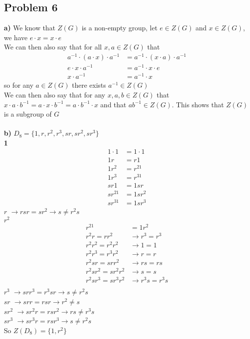 \documentclass[12pt]{article}
\begin{document}
\subsection*{Problem 6}
\textbf{a) } We know that $Z(G)$ is a non-empty group, let $e \in Z(G)$ and $x \in Z(G)$, we have $e \cdot x = x \cdot e$\\
We can then also say that for all $x,a \in Z(G)$ that
\begin{align*}
a^{-1} \cdot (a \cdot x) \cdot a^{-1} &= a^{-1} \cdot (x \cdot a) \cdot a^{-1} \\
e \cdot x \cdot a^{-1} &= a^{-1} \cdot x \cdot e\\
x \cdot a^{-1} &= a^{-1} \cdot x
\end{align*}
so for any $a \in Z(G)$ there exists $a^{-1} \in Z(G)$\\
We can then also say that for any $x,a,b \in Z(G)$ that $x \cdot a \cdot b^{-1} = a \cdot x \cdot b^{-1} = a \cdot b^{-1} \cdot x$ and that $ab^{-1} \in Z(G)$. This shows that $Z(G)$ is a subgroup of $G$ \\\\
\textbf{b) } $D_8 = \{ 1, r, r^2, r^3, sr, sr^2, sr^3 \}$ \\
\textbf{1 }
\begin{align*}
1 \cdot 1 &= 1\cdot 1\\ 
1r &= r1 \\
1r^2 &= r^21 \\
1r^3 &= r^31 \\ 
sr1 &= 1sr \\
sr^21 &= 1sr^2 \\
sr^31 &= 1sr^3
\end{align*}
\textbf{$r$ } $\rightarrow rsr = sr^2 \rightarrow s \neq r^2s$\\
\textbf{$r^2$ } 
\begin{align*}
r^21 &= 1r^2 \\
r^2r = rr^2 &\rightarrow r^3 = r^3\\
r^2r^2 = r^2r^2 &\rightarrow 1 = 1\\
r^2r^3 = r^3r^2 &\rightarrow r = r\\
r^2sr = srr^2 &\rightarrow rs = rs\\
r^2sr^2 = sr^2r^2 &\rightarrow s = s\\
r^2sr^3 = sr^3r^2 &\rightarrow r^3s = r^3s\\
\end{align*}
\textbf{$r^3$ } $\rightarrow srr^3 = r^3sr \rightarrow s \neq r^2s$ \\
\textbf{$sr$ } $\rightarrow srr = rsr \rightarrow r^2 \neq s$\\
\textbf{$sr^2$ } $\rightarrow sr^2r = rsr^2 \rightarrow rs \neq r^3s$\\
\textbf{$sr^3$ } $\rightarrow sr^3r = rsr^3 \rightarrow s \neq r^2s$\\
So $Z(D_8) = \{ 1, r^2 \}$
\newpage
\end{document}
